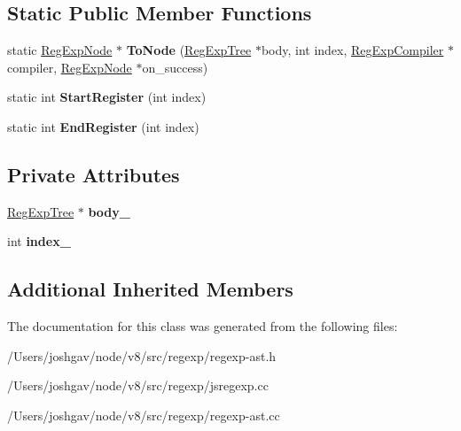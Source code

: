\subsection*{Static Public Member Functions}
\begin{DoxyCompactItemize}
\item 
static \hyperlink{classv8_1_1internal_1_1_reg_exp_node}{Reg\+Exp\+Node} $\ast$ {\bfseries To\+Node} (\hyperlink{classv8_1_1internal_1_1_reg_exp_tree}{Reg\+Exp\+Tree} $\ast$body, int index, \hyperlink{classv8_1_1internal_1_1_reg_exp_compiler}{Reg\+Exp\+Compiler} $\ast$compiler, \hyperlink{classv8_1_1internal_1_1_reg_exp_node}{Reg\+Exp\+Node} $\ast$on\+\_\+success)\hypertarget{classv8_1_1internal_1_1_reg_exp_capture_a1d59e925e62a0dd0b69504f08d41ee35}{}\label{classv8_1_1internal_1_1_reg_exp_capture_a1d59e925e62a0dd0b69504f08d41ee35}

\item 
static int {\bfseries Start\+Register} (int index)\hypertarget{classv8_1_1internal_1_1_reg_exp_capture_a0688175225b8ad469d511cc8d0b189f4}{}\label{classv8_1_1internal_1_1_reg_exp_capture_a0688175225b8ad469d511cc8d0b189f4}

\item 
static int {\bfseries End\+Register} (int index)\hypertarget{classv8_1_1internal_1_1_reg_exp_capture_a254b89ebf6d04d0ba52c0d60a06744ca}{}\label{classv8_1_1internal_1_1_reg_exp_capture_a254b89ebf6d04d0ba52c0d60a06744ca}

\end{DoxyCompactItemize}
\subsection*{Private Attributes}
\begin{DoxyCompactItemize}
\item 
\hyperlink{classv8_1_1internal_1_1_reg_exp_tree}{Reg\+Exp\+Tree} $\ast$ {\bfseries body\+\_\+}\hypertarget{classv8_1_1internal_1_1_reg_exp_capture_aa07ee7b0719d8d12d793e3dc6cb512b0}{}\label{classv8_1_1internal_1_1_reg_exp_capture_aa07ee7b0719d8d12d793e3dc6cb512b0}

\item 
int {\bfseries index\+\_\+}\hypertarget{classv8_1_1internal_1_1_reg_exp_capture_aafda6bd4bf8cb41cbccf57299e5f6344}{}\label{classv8_1_1internal_1_1_reg_exp_capture_aafda6bd4bf8cb41cbccf57299e5f6344}

\end{DoxyCompactItemize}
\subsection*{Additional Inherited Members}


The documentation for this class was generated from the following files\+:\begin{DoxyCompactItemize}
\item 
/\+Users/joshgav/node/v8/src/regexp/regexp-\/ast.\+h\item 
/\+Users/joshgav/node/v8/src/regexp/jsregexp.\+cc\item 
/\+Users/joshgav/node/v8/src/regexp/regexp-\/ast.\+cc\end{DoxyCompactItemize}
